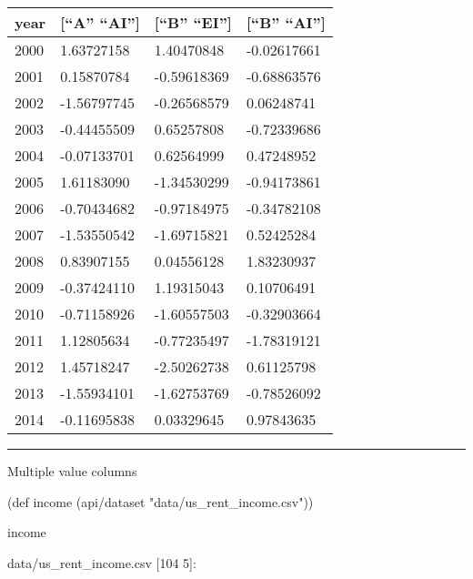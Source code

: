 \documentclass[]{article}
\newenvironment{Shaded}{\begin{snugshade}}{\end{snugshade}}
\newcommand{\BuiltInTok}[1]{#1}
\newcommand{\FunctionTok}[1]{\textcolor[rgb]{0.00,0.00,0.00}{#1}}
\newcommand{\NormalTok}[1]{#1}
\newcommand{\StringTok}[1]{\textcolor[rgb]{0.31,0.60,0.02}{#1}}
\begin{document}
\begin{longtable}[]{@{}llll@{}}
\toprule
year & {[}``A'' ``AI''{]} & {[}``B'' ``EI''{]} & {[}``B''
``AI''{]}\tabularnewline
\midrule
\endhead
2000 & 1.63727158 & 1.40470848 & -0.02617661\tabularnewline
2001 & 0.15870784 & -0.59618369 & -0.68863576\tabularnewline
2002 & -1.56797745 & -0.26568579 & 0.06248741\tabularnewline
2003 & -0.44455509 & 0.65257808 & -0.72339686\tabularnewline
2004 & -0.07133701 & 0.62564999 & 0.47248952\tabularnewline
2005 & 1.61183090 & -1.34530299 & -0.94173861\tabularnewline
2006 & -0.70434682 & -0.97184975 & -0.34782108\tabularnewline
2007 & -1.53550542 & -1.69715821 & 0.52425284\tabularnewline
2008 & 0.83907155 & 0.04556128 & 1.83230937\tabularnewline
2009 & -0.37424110 & 1.19315043 & 0.10706491\tabularnewline
2010 & -0.71158926 & -1.60557503 & -0.32903664\tabularnewline
2011 & 1.12805634 & -0.77235497 & -1.78319121\tabularnewline
2012 & 1.45718247 & -2.50262738 & 0.61125798\tabularnewline
2013 & -1.55934101 & -1.62753769 & -0.78526092\tabularnewline
2014 & -0.11695838 & 0.03329645 & 0.97843635\tabularnewline
\bottomrule
\end{longtable}

\begin{center}\rule{0.5\linewidth}{0.5pt}\end{center}

Multiple value columns

\begin{Shaded}
\begin{Highlighting}[]
\NormalTok{(}\BuiltInTok{def}\FunctionTok{ income }\NormalTok{(api/dataset }\StringTok{"data/us_rent_income.csv"}\NormalTok{))}
\end{Highlighting}
\end{Shaded}

\begin{Shaded}
\begin{Highlighting}[]
\NormalTok{income}
\end{Highlighting}
\end{Shaded}

data/us\_rent\_income.csv {[}104 5{]}:
\end{document}
